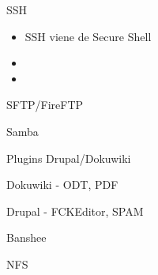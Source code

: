 \documentclass[spanish]{beamer}
\begin{document}
\begin{frame}{SSH}
\begin{itemize}
\item SSH viene de Secure Shell
\item 
\item 
\end{itemize}
\end{frame}
\begin{frame}{SFTP/FireFTP}
\end{frame}
\begin{frame}{Samba}
\end{frame}
\begin{frame}{Plugins Drupal/Dokuwiki}
\end{frame}
\begin{frame}{Dokuwiki - ODT, PDF}
\end{frame}
\begin{frame}{Drupal - FCKEditor, SPAM}
\end{frame}
\begin{frame}{Banshee}
\end{frame}
\begin{frame}{NFS}
\end{frame}
\end{document}
